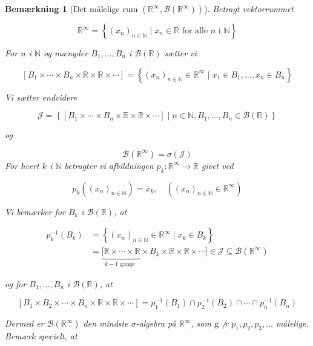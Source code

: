 \documentclass{article}
\newcommand{\R}{\mathbb{R}}
\newcommand{\1}{\mathbbm{1}}
\theoremstyle{boxed}
\newtheorem{remark}[theorem]{Bemærkning}
\begin{document}
\begin{remark}[Det målelige rum $(\R^{\infty},\mathcal{B}(\R^{\infty}))$]
    Betragt vektorrummet

$$
\mathbb{R}^{\infty}=\left\{\left(x_n\right)_{n \in \mathbb{N}} \mid x_n \in \mathbb{R} \text { for alle } n \text { i } \mathbb{N}\right\}
$$


For $n$ i $\mathbb{N}$ og mængder $B_1, \ldots, B_n$ i $\mathcal{B}(\mathbb{R})$ sætter vi

$$
\left[B_1 \times \cdots \times B_n \times \mathbb{R} \times \mathbb{R} \times \cdots\right]=\left\{\left(x_n\right)_{n \in \mathbb{N}} \in \mathbb{R}^{\infty} \mid x_1 \in B_1, \ldots, x_n \in B_n\right\}
$$


Vi sætter endvidere

$$
\mathcal{J}=\left\{\left[B_1 \times \cdots \times B_n \times \mathbb{R} \times \mathbb{R} \times \cdots\right] \mid n \in \mathbb{N}, B_1, \ldots, B_n \in \mathcal{B}(\mathbb{R})\right\}
$$

og

$$
\mathcal{B}\left(\mathbb{R}^{\infty}\right)=\sigma(\mathcal{J})
$$
For hvert $k$ i $\mathbb{N}$ betragter vi afbildningen $p_k: \mathbb{R}^{\infty} \rightarrow \mathbb{R}$ givet ved

$$
p_k\left(\left(x_n\right)_{n \in \mathbb{N}}\right)=x_k, \quad\left(\left(x_n\right)_{n \in \mathbb{N}} \in \mathbb{R}^{\infty}\right)
$$


Vi bemærker for $B_k$ i $\mathcal{B}(\mathbb{R})$, at

$$
\begin{aligned}
p_k^{-1}\left(B_k\right) & =\left\{\left(x_n\right)_{n \in \mathbb{N}} \in \mathbb{R}^{\infty} \mid x_k \in B_k\right\} \\
& =\underbrace{[\mathbb{R} \times \cdots \times \mathbb{R}}_{k-1 \text { gange }} \times B_k \times \mathbb{R} \times \mathbb{R} \times \cdots] \in \mathcal{J} \subseteq \mathcal{B}\left(\mathbb{R}^{\infty}\right)
\end{aligned}
$$

og for $B_1, \ldots, B_n$ i $\mathcal{B}(\mathbb{R})$, at

$$
\left[B_1 \times B_2 \times \cdots \times B_n \times \mathbb{R} \times \mathbb{R} \times \cdots\right]=p_1^{-1}\left(B_1\right) \cap p_2^{-1}\left(B_2\right) \cap \cdots \cap p_n^{-1}\left(B_n\right)
$$


Dermed er $\mathcal{B}\left(\mathbb{R}^{\infty}\right)$ den mindste $\sigma$-algebra på $\mathbb{R}^{\infty}$, som $\mathrm{g} \not$ r $p_1, p_2, p_3, \ldots$ målelige.
Bemærk specielt, at


\end{remark}
\end{document}
